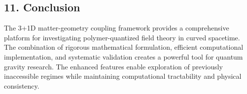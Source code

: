 \documentclass[12pt]{article}
\begin{document}
\subsection*{11. Conclusion}
The 3+1D matter-geometry coupling framework provides a comprehensive platform for investigating polymer-quantized field theory in curved spacetime. The combination of rigorous mathematical formulation, efficient computational implementation, and systematic validation creates a powerful tool for quantum gravity research. The enhanced features enable exploration of previously inaccessible regimes while maintaining computational tractability and physical consistency.
\end{document}

